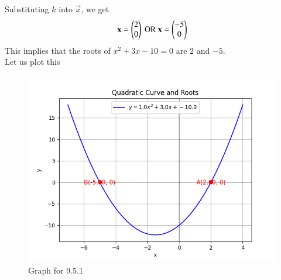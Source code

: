 \documentclass[journal,12pt,onecolumn]{IEEEtran}
\theoremstyle{remark}
\begin{document}
Substituting $k$ into $\vec{x}$, we get
\begin{align}
    \mathbf{x} = \begin{pmatrix}2 \\ 0\end{pmatrix} \text{ OR } \mathbf{x}=\begin{pmatrix}-5 \\ 0\end{pmatrix}
\end{align}
This implies that the roots of $x^2 +3x -10 =0$ are $2$ and $-5$.\\
Let us plot this
\begin{figure}
    \centering
    \includegraphics[width=1\columnwidth]{figs/1.png}
    \caption{Graph for 9.5.1}
    \label{fig:placeholder}
\end{figure}
\end{document}
